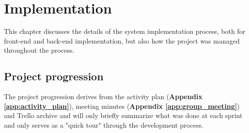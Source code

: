 
\chapter{Implementation}

This chapter discusses the details of the system implementation process, both for front-end and back-end implementation, but also how the project was managed throughout the process.


\section{Project progression}
The project progression derives from the activity plan (\textbf{Appendix \ref{app:activity_plan}}), meeting minutes (\textbf{Appendix \ref{app:group_meeting}}) and Trello archive and will only briefly summarize what was done at each sprint and only serves as a "quick tour" through the development process.

